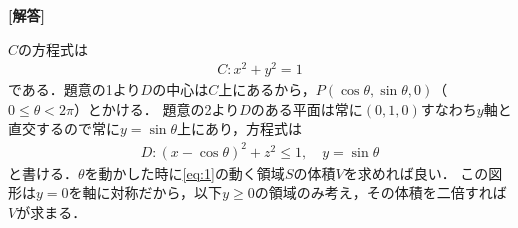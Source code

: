 \documentclass[../../main.tex]{subfiles}
\begin{document}
\begin{oframed}
  
\end{oframed}

{\bf [解答]}

$C$の方程式は
\begin{align}
  C:x^2+y^2=1
\end{align}
である．題意の1より$D$の中心は$C$上にあるから，$P(\cos\theta,\sin\theta,0)$（$0\le\theta<2\pi$）とかける．
題意の2より$D$のある平面は常に$(0,1,0)$すなわち$y$軸と直交するので常に$y=\sin\theta$上にあり，方程式は
\begin{align}
  D: (x-\cos\theta)^2+z^2\le1,\quad y=\sin\theta \label{eq:1}
\end{align}
と書ける．$\theta$を動かした時に\cref{eq:1}の動く領域$S$の体積$V$を求めれば良い．
この図形は$y=0$を軸に対称だから，以下$y \ge 0$の領域のみ考え，その体積を二倍すれば$V$が求まる．
\end{document}
